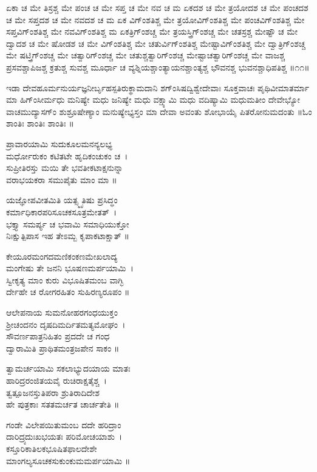 ಏಕಾ ಚ ಮೇ ತಿಸ್ರಶ್ಚ ಮೇ ಪಂಚ ಚ ಮೇ ಸಪ್ತ ಚ ಮೇ ನವ ಚ ಮ ಏಕದಶ ಚ ಮೇ ತ್ರಯೋದಶ ಚ ಮೇ ಪಂಚದಶ ಚ ಮೇ ಸಪ್ತದಶ ಚ ಮೇ ನವದಶ ಚ ಮ ಏಕ ವಿಗ್ಂಶತಿಶ್ಚ ಮೇ ತ್ರಯೋವಿಗ್ಂಶತಿಶ್ಚ ಮೇ ಪಂಚವಿಗ್ಂಶತಿಶ್ಚ ಮೇ ಸಪ್ತವಿಗ್ಂಶತಿಶ್ಚ ಮೇ ನವವಿಗ್ಂಶತಿಶ್ಚ ಮ ಏಕತ್ರಿಗ್ಂಶಚ್ಚ ಮೇ ತ್ರಯಸ್ತ್ರಿಗ್ಂಶಚ್ಚ ಮೇ ಚತಸ್ರಶ್ಚ ಮೇಷ್ಟೌ ಚ ಮೇ ದ್ವಾದಶ ಚ ಮೇ ಷೋಡಶ ಚ ಮೇ ವಿಗ್ಂಶತಿಶ್ಚ ಮೇ ಚತುರ್ವಿಗ್ಂಶತಿಶ್ಚ ಮೇಷ್ಟಾವಿಗ್ಂಶತಿಶ್ಚ ಮೇ ದ್ವಾತ್ರಿಗ್ಂಶಚ್ಚ ಮೇ ಷಟ್ತ್ರಿಗ್ಂಶಚ್ಚ ಮೇ ಚತ್ವಾರಿಗ್ಂಶಚ್ಚ ಮೇ ಚತುಶ್ಚತ್ವಾರಿಗ್ಂಶಚ್ಚ ಮೇಷ್ಟಾಚತ್ವಾರಿಗ್ಂಶಚ್ಚ ಮೇ ವಾಜಶ್ಚ ಪ್ರಸವಶ್ಚಾಪಿಜಶ್ಚ ಕ್ರತುಶ್ಚ ಸುವಶ್ಚ ಮೂರ್ಧಾ ಚ ವ್ಯಶ್ನಿಯಶ್ಚಾಂತ್ಯಾಯನಶ್ಚಾಂತ್ಯಶ್ಚ ಭೌವನಶ್ಚ ಭುವನಶ್ಚಾಧಿಪತಿಶ್ಚ ॥೧೧॥

ಇಡಾ ದೇವಹೂರ್ಮನುರ್ಯಜ್ಞನೀರ್ಬೃಹಸ್ಪತಿರುಕ್ಥಾಮದಾನಿ ಶಗ್ಂಸಿಷದ್ವಿಶ್ವೇದೇವಾಃ ಸೂಕ್ತವಾಚಃ ಪೃಥಿವೀಮಾತರ್ಮಾ ಮಾ ಹಿಗ್ಂಸೀರ್ಮಧು ಮನಿಷ್ಯೇ ಮಧು ಜನಿಷ್ಯೇ ಮಧು ವಕ್ಷ್ಯಾಮಿ ಮಧು ವದಿಷ್ಯಾಮಿ ಮಧುಮತೀಂ ದೇವೇಭ್ಯೋ ವಾಚಮುದ್ಯಾಸಗ್ಂ ಶುಶ್ರೂಷೇಣ್ಯಾಂ ಮನುಷ್ಯೇಭ್ಯಸ್ತಂ ಮಾ ದೇವಾ ಅವಂತು ಶೋಭಾಯೈ ಪಿತರೋನುಮದಂತು ॥ಓಂ ಶಾಂತಿಃ ಶಾಂತಿಃ ಶಾಂತಿಃ ॥

ಪ್ರಾವಾರಯಾಮಿ ಸುದುಕೂಲಮನನ್ಯಲಭ್ಯ\\ಮರ್ಧೋರುಕಂ ಕಟಿತಟೇ ಹೃದಿಕಂಚುಕಂ ಚ~।\\
ಸುಪ್ರೀತಿರಸ್ತು ಮಯಿ ತೇ ಭವತೀಕಟಾಕ್ಷನುನ್ನಾ \\ವರಾಭಯಕರಾ ಸಮುಪೈತು ಮಾಂ ಮಾ ॥

ಯಜ್ಞೋಪವೀತಮಿತಿ ಯತ್ಸ್ಮೃತಿಷು ಪ್ರಸಿದ್ಧಂ\\ ಕರ್ಮಾಧಿಕಾರಪರಿಸೂಚಕಸೂತ್ರಮೇತತ್~।\\
ಭಕ್ತ್ಯಾ ಸಮರ್ಪ್ಯ ಚ ಭವಾಮಿ ಸಮಾಧಿಯುಕ್ತೋ \\ನಿಃಕ್ಷುತ್ಪಿಪಾಸ ಇಹ ತೇಽಮ್ಬ ಕೃಪಾಕಟಾಕ್ಷಾತ್ ॥

ಕೇಯೂರಮಂಗದಮಣಿಕಂಕಣಮೇಖಲಾದ್ಯ\-\\ಮಂಗೇಷು ತೇ ಜನನಿ ಭೂಷಣಮರ್ಪಯಾಮಿ~।\\
ಸ್ವೀಕೃತ್ಯ ಮಾಂ ಕುರು ವಿಭೂಷಿತಮಂಬ ವಾಗ್ಭಿ\-\\ರ್ದೇಹೇ ಚ ರೋಗರಹಿತಂ ಸುಹಿರಣ್ಯರೂಪಂ ॥

ಆಲೇಪನಾಯ ಸುಮನೋಹರಗಂಧಯುಕ್ತಂ\\ ಶ್ರೀಚಂದನಂ ದೃಷದಿಮರ್ದಿತಮತ್ಯಮೋಘಂ~।\\
ಸೌವರ್ಣಪಾತ್ರನಿಹಿತಂ ಪ್ರದದೇ ಚ ಗಂಧ\-\\ದ್ವಾರಾಮಿತಿ ಪ್ರಾಥಿತಮಂತ್ರಜಪೇನ ಸಾಕಂ ॥

ತ್ವಾಮರ್ಚಯಾಮಿ ಸಕಲಾಭ್ಯುದಯಾಯ ಮಾತಃ\\ಹಾರಿದ್ರರಂಜಿತಯವೈ ರುಚಿರಾಕ್ಷತೈಶ್ಚ~।\\
ತ್ವತ್ಪೂಜನಸ್ತುತಿಪರಾ ಶ್ರುತಿರಾದಿದೇಶ \\ಹೇ ಪುತ್ರಕಾಃ ಸತತಮರ್ಚತ ಚಾರ್ಚತೇತಿ ॥

ಗಂಡೇ ವಿಲೇಪಯಿತುಮಂಬ ದದೇ ಹರಿದ್ರಾಂ\\ ದಾರಿದ್ರ್ಯದುಃಖಭಯತಃ ಪರಿಮೋಚಯಾಶು~।\\
ಕಸ್ತೂರಿಕಾತಿಲಕಭೂಷಿತಫಾಲದೇಶೇ \\ಮಾಂಗಲ್ಯಸೂಚಕಸುಕುಂಕುಮಮರ್ಪಯಾಮಿ ॥

